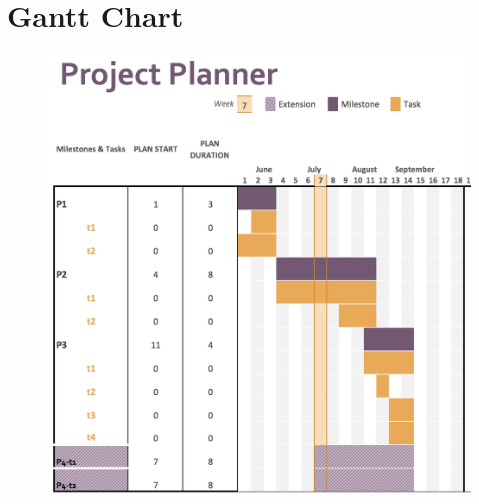 \section{Gantt Chart}
\begin{figure}[H]
	\centering
	\includegraphics[scale=.75]{figures/Gantt}
	\label{fig:Gantt}
\end{figure}
